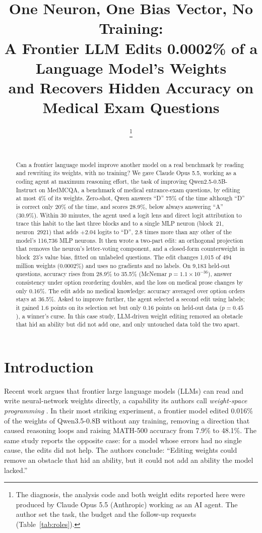 \documentclass[11pt]{article}
\title{\textbf{One Neuron, One Bias Vector, No Training:}\\[2pt]
\large A Frontier LLM Edits 0.0002\% of a Language Model's Weights\\ and Recovers Hidden Accuracy on Medical Exam Questions}
\author{\AuthorName\thanks{The diagnosis, the analysis code and both weight edits reported here were produced by Claude Opus 5.5 (Anthropic) working as an AI agent. The author set the task, the budget and the follow-up requests (Table~\ref{tab:roles}).}\\ \AuthorAffil\\ \texttt{\AuthorEmail}}
\date{}
\begin{document}
\maketitle

\begin{abstract}
Can a frontier language model improve another model on a real benchmark by reading and rewriting its weights, with no training? We gave Claude Opus 5.5, working as a coding agent at maximum reasoning effort, the task of improving Qwen2.5-0.5B-Instruct on MedMCQA, a benchmark of medical entrance-exam questions, by editing at most 4\% of its weights. Zero-shot, Qwen answers ``D'' 75\% of the time although ``D'' is correct only 20\% of the time, and scores 28.9\%, below always answering ``A'' (30.9\%). Within 30 minutes, the agent used a logit lens and direct logit attribution to trace this habit to the last three blocks and to a single MLP neuron (block~21, neuron~2921) that adds $+2.04$ logits to ``D'', 2.8 times more than any other of the model's 116{,}736 MLP neurons. It then wrote a two-part edit: an orthogonal projection that removes the neuron's letter-voting component, and a closed-form counterweight in block~23's value bias, fitted on unlabeled questions. The edit changes 1{,}015 of 494 million weights (0.0002\%) and uses no gradients and no labels. On 9{,}183 held-out questions, accuracy rises from 28.9\% to 35.5\% (McNemar $p=1.1\times10^{-36}$), answer consistency under option reordering doubles, and the loss on medical prose changes by only 0.16\%. The edit adds no medical knowledge: accuracy averaged over option orders stays at 36.5\%. Asked to improve further, the agent selected a second edit using labels; it gained 1.6 points on its selection set but only 0.16 points on held-out data ($p=0.45$), a winner's curse. In this case study, LLM-driven weight editing removed an obstacle that hid an ability but did not add one, and only untouched data told the two apart.
\end{abstract}

\section{Introduction}

Recent work argues that frontier large language models (LLMs) can read and write neural-network weights directly, a capability its authors call \emph{weight-space programming} \citep{takehi2026weightspace}. In their most striking experiment, a frontier model edited 0.016\% of the weights of Qwen3.5-0.8B without any training, removing a direction that caused reasoning loops and raising MATH-500 accuracy from 7.9\% to 48.1\%. The same study reports the opposite case: for a model whose errors had no single cause, the edits did not help. The authors conclude: ``Editing weights could remove an obstacle that hid an ability, but it could not add an ability the model lacked.''
\end{document}
